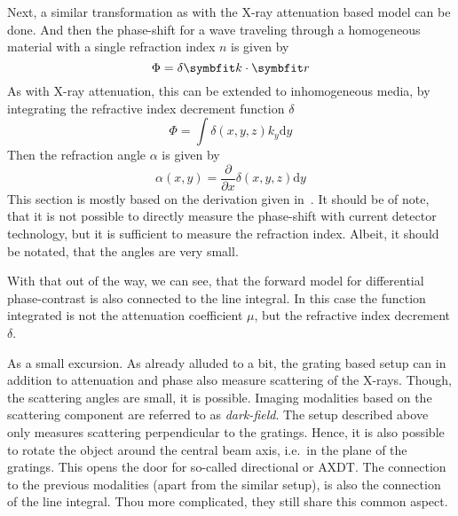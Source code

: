 Next, a similar transformation as with the X-ray attenuation based model can be done. And then the
phase-shift for a wave traveling through a homogeneous material with a single refraction index \(n\)
is given by
\begin{equation}
	\Phi = \delta \mvec{k} \cdot \mvec{r}
\end{equation}
As with X-ray attenuation, this can be extended to inhomogeneous media, by integrating the refractive
index decrement function \(\delta\)
\begin{equation}
	\Phi = \int \delta(x, y, z) k_y \mathrm{d}y
\end{equation}
Then the refraction angle \(\alpha\) is given by
\begin{equation}
	\alpha(x,y) = \frac{\partial}{\partial x} \delta(x, y, z) \mathrm{d}y
\end{equation}
This section is mostly based on the derivation given in~\cite{hahn_statistical_2014}.
It should be of note, that it is not possible to directly measure the phase-shift with current
detector technology, but it is sufficient to measure the refraction index. Albeit, it should be
notated, that the angles are very small.

With that out of the way, we can see, that the forward model for differential phase-contrast is also
connected to the line integral. In this case the function integrated is not the attenuation
coefficient \(\mu\), but the refractive index decrement \(\delta\).

As a small excursion. As already alluded to a bit, the grating based setup can in addition to
attenuation and phase also measure scattering of the X-rays. Though, the scattering angles are
small, it is possible. Imaging modalities based on the scattering component are referred to as
\textit{dark-field}. The setup described above only measures scattering perpendicular to the
gratings. Hence, it is also possible to rotate the object around the central beam axis, i.e.\ in the
plane of the gratings. This opens the door for so-called directional or \gls{AXDT}. The connection
to the previous modalities (apart from the similar setup), is also the connection of the line
integral. Thou more complicated, they still share this common aspect.

